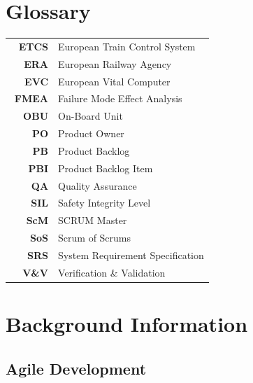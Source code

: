 
\section{Glossary}
\label{sec:glossary}



\begin{tabular}{rl}
\ %
\textbf{ETCS} & European Train Control System \\ 
\textbf{ERA} & European Railway Agency \\ 
\textbf{EVC} & European Vital Computer \\
\textbf{FMEA} & Failure Mode Effect Analysis \\ 
\textbf{OBU} & On-Board Unit \\ 
\textbf{PO} & Product Owner \\
\textbf{PB} & Product Backlog \\
\textbf{PBI} & Product Backlog Item \\ 
\textbf{QA} & Quality Assurance \\
\textbf{SIL} & Safety Integrity Level \\
\textbf{ScM} & SCRUM Master \\
\textbf{SoS} & Scrum of Scrums \\ 
\textbf{SRS} & System Requirement Specification \\ 
\textbf{V\&V} & Verification \& Validation \\ 
\end{tabular} 




\section{Background Information}
\label{sec:Background}


\subsection{Agile Development}


